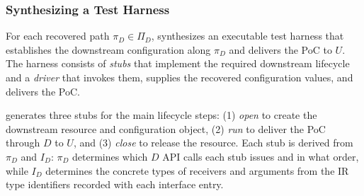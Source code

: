 \subsubsection{Synthesizing a Test Harness}\label{subsubsec:harness}
For each recovered path $\pi_D \in \Pi_D$, \sys synthesizes an executable test harness that establishes the downstream configuration along $\pi_D$ and delivers the PoC to $U$. The harness consists of \textit{stubs} that implement the required downstream lifecycle and a \textit{driver} that invokes them, supplies the recovered configuration values, and delivers the PoC.





\sys generates three stubs for the main lifecycle steps: (1) \textit{open} to create the downstream resource and configuration object, (2) \textit{run} to deliver the PoC through $D$ to $U$, and (3) \textit{close} to release the resource. 
Each stub is derived from $\pi_D$ and $I_D$: $\pi_D$ determines which $D$ API calls each stub issues and in what order, while $I_D$ determines the concrete types of receivers and arguments from the IR type identifiers recorded with each interface entry.



